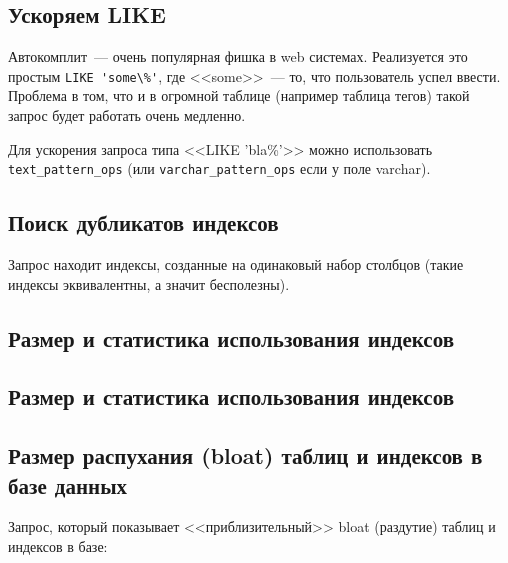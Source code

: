 \subsection{Ускоряем LIKE}
Автокомплит~--- очень популярная фишка в web системах. Реализуется это простым \lstinline!LIKE 'some\%'!, где <<some>>~--- то, что пользователь успел ввести. Проблема в том, что и в огромной таблице (например таблица тегов) такой запрос будет работать очень медленно.

Для ускорения запроса типа <<LIKE 'bla\%'>> можно использовать \lstinline!text_pattern_ops! (или \lstinline!varchar_pattern_ops! если у поле varchar).



\subsection{Поиск дубликатов индексов}
Запрос находит индексы, созданные на одинаковый набор столбцов (такие индексы эквивалентны, а значит бесполезны).



\subsection{Размер и статистика использования индексов}



\subsection{Размер и статистика использования индексов}



\subsection{Размер распухания (bloat) таблиц и индексов в базе данных}
\label{sec:snippets-bloating}

Запрос, который показывает <<приблизительный>> bloat (раздутие) таблиц и индексов в базе:


